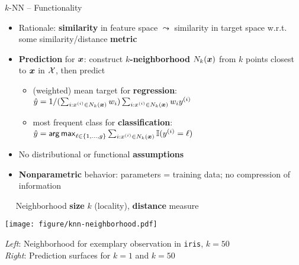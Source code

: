 \begin{frame}{$k$-NN -- Functionality}

  
 

\medskip

\begin{itemize}
  \item Rationale: \textbf{similarity} in feature space $\leadsto$ similarity 
  in target space w.r.t. some similarity/distance \textbf{metric}
  \item \textbf{Prediction} for $\bm{x}$: construct \textbf{$k$-neighborhood} 
  $N_k(\bm{x})$ from $k$ points closest to $\bm{x}$ in $\mathcal{X}$, then 
  predict
  \begin{itemize}
    \footnotesize
    \item (weighted) mean target for \textbf{regression}: $\hat{y} = 1 / 
    (\sum_{i: x^{(i)} \in N_k(\bm{x})} w_i) \sum_{i: x^{(i)} \in N_k(\bm{x})} w_i y^{(i)}$
    \item most frequent class for \textbf{classification}: 
    $\hat{y} = \mathop{\sf arg\,max}_{\ell \in \{1, \ldots, g\}} \sum_{i: x^{(i)} \in N_k(\bm{x})} \mathbb{I}(y^{(i)} = \ell)$
  \end{itemize}
  \item No distributional or functional \textbf{assumptions}
  \item \textbf{Nonparametric} behavior: parameters = training data; no 
  compression of information
\end{itemize}

\medskip

 ~~ Neighborhood \textbf{size} $k$ (locality), 
\textbf{distance} measure

\vfill

\begin{minipage}{0.75\textwidth}
  \texttt{[image: figure/knn-neighborhood.pdf]}
\end{minipage}%
\hfill
\begin{minipage}{0.2\textwidth}
  \tiny
  \raggedright
  \textit{Left}: Neighborhood for exemplary observation in \texttt{iris}, 
  $k = 50$ \\
  \textit{Right}: Prediction surfaces for $k = 1$ and $k = 50$
\end{minipage}
\end{frame}

